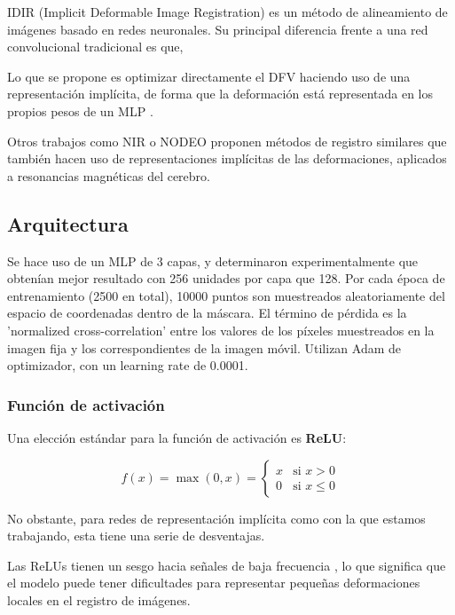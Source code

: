 IDIR (Implicit Deformable Image Registration) es un método de alineamiento de imágenes basado en redes neuronales.
Su principal diferencia frente a una red convolucional tradicional es que,

Lo que se propone es optimizar directamente el DFV haciendo uso de una representación implícita, de forma que la deformación está representada en los propios pesos de un MLP \cite{wolterink2021implicit}.

Otros trabajos como NIR \cite{sun2024medicalimageregistrationneural} o NODEO \cite{nodeo} proponen métodos de registro similares que también hacen uso de representaciones implícitas de las deformaciones, aplicados a resonancias magnéticas del cerebro.

\subsection{Arquitectura}
\label{subsubsec:Arquitectura}

Se hace uso de un MLP de 3 capas, y determinaron experimentalmente que obtenían mejor resultado con 256 unidades por capa que 128.
Por cada época de entrenamiento (2500 en total), 10000 puntos son muestreados aleatoriamente del espacio de coordenadas dentro de la máscara.
El término de pérdida es la 'normalized cross-correlation' entre los valores de los píxeles muestreados en la imagen fija y los correspondientes de la imagen móvil.
Utilizan Adam de optimizador, con un learning rate de 0.0001.

\subsubsection{Función de activación}
\label{subsubsec:Función de activación}

Una elección estándar para la función de activación es \textbf{ReLU}:

\[
f(x) = \max(0, x) = \begin{cases} 
x & \text{si } x > 0 \\ 
0 & \text{si } x \leq 0 
\end{cases}
\]

No obstante, para redes de representación implícita como con la que estamos trabajando, esta tiene una serie de desventajas.

Las ReLUs tienen un sesgo hacia señales de baja frecuencia \cite{rahaman2019spectralbiasneuralnetworks},
lo que significa que el modelo puede tener dificultades para representar pequeñas deformaciones locales en el registro de imágenes.

